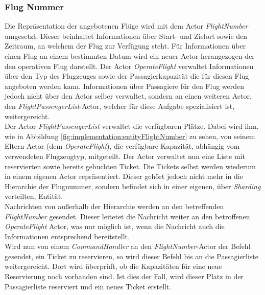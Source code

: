 \subsubsection{Flug Nummer}
Die Repräsentation der angebotenen Flüge wird mit dem Actor \textit{FlightNumber} umgesetzt. Dieser beinhaltet Informationen über Start- und Zielort sowie den Zeitraum, an welchem der Flug zur Verfügung steht. Für Informationen über einen Flug an einem bestimmten Datum wird ein neuer Actor herangezogen der den operativen Flug darstellt. Der Actor \textit{OperateFlight} verwaltet Informationen über den Typ des Flugzeuges sowie der Passagierkapazität die für diesen Flug angeboten werden kann. Informationen über Passagiere für den Flug werden jedoch nicht über den Actor selber verwaltet, sondern an einen weiteren Actor, den \textit{FlightPassengerList}-Actor, welcher für diese Aufgabe spezialisiert ist, weitergereicht. \\
Der Actor \textit{FlightPassengerList} verwaltet die verfügbaren Plätze. Dabei wird ihm, wie in Abbildung \ref{fig:implementation:entityFlightNumber} zu sehen, von seinem Eltern-Actor (dem \textit{OperateFlight}), die verfügbare Kapazität, abhängig vom verwendeten Flugzeugtyp, mitgeteilt. Der Actor verwaltet nun eine Liste mit reservierten sowie bereits gebuchten Ticket. Die Tickets selbst werden wiederum in einem eigenen Actor repräsentiert. Dieser gehört jedoch nicht mehr in die Hierarchie der Flugnummer, sondern befindet sich in einer eigenen, über \textit{Sharding} verteilten, Entität. \\
Nachrichten von außerhalb der Hierarchie werden an den betreffenden \textit{FlightNumber} gesendet. Dieser leitetet die Nachricht weiter an den betroffenen \textit{OperateFlight} Actor, was nur möglich ist, wenn die Nachricht auch die Informationen entsprechend bereitstellt. \\
Wird nun von einem \textit{CommandHandler} an den \textit{FlightNumber}-Actor der Befehl gesendet, ein Ticket zu reservieren, so wird dieser Befehl bis an die Passagierliste weitergereicht. Dort wird überprüft, ob die Kapazitäten für eine neue Reservierung noch vorhanden sind. Ist dies der Fall, wird dieser Platz in der Passagierliste reserviert und ein neues Ticket erstellt. 
